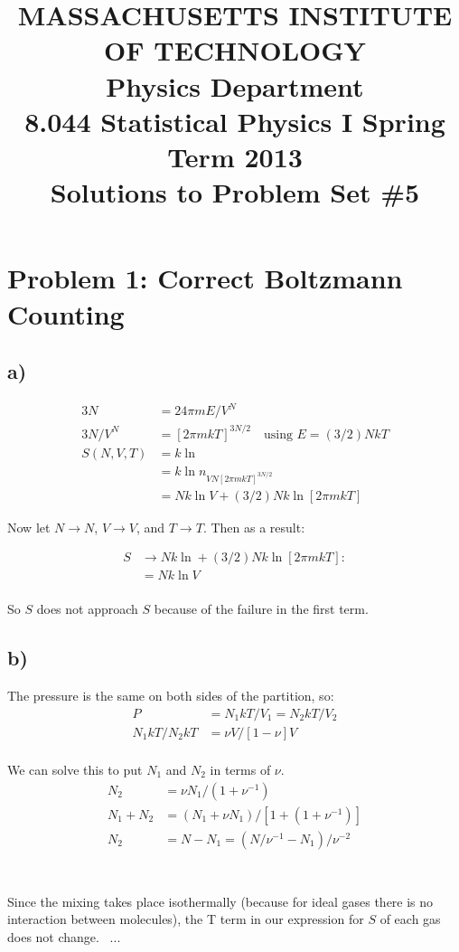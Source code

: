 \documentclass{article}
\begin{document}
\title{MASSACHUSETTS INSTITUTE OF TECHNOLOGY \\ Physics Department \\ 8.044 Statistical Physics I Spring Term 2013 \\ Solutions to Problem Set \#5}
\maketitle

\section*{Problem 1: Correct Boltzmann Counting}

\subsection*{a)}
\begin{align*}
3N &= 24\pi mE / V^N \\
3N / V^N &= [2\pi mkT]^{3N/2} \quad \text{using } E=(3/2)NkT \\
S(N,V,T) &= k \ln  \\
&=k \ln n_{VN[2\pi mkT]^{3N/2}} \\
&= Nk \ln V + (3/2)Nk \ln[2\pi mkT]
\end{align*}

Now let $N \rightarrow N$, $V \rightarrow V$, and $T \rightarrow T$. Then as a result:

\begin{align*}
S &\rightarrow  Nk \ln  + (3/2)Nk \ln[2\pi mkT] : \\
&= Nk \ln V \\
\end{align*}

So $S$ does not approach $S$ because of the failure in the first term.

\subsection*{b)} 
The pressure is the same on both sides of the partition, so:
\begin{align*}
P &= N_1kT/V_1= N_2kT/V_2 \\
N_1kT/N_2kT&=\nu V/[1-\nu]V \\
\end{align*}

We can solve this to put $N_1$ and $N_2$ in terms of $\nu$.
\begin{align*}
N_2&=\nu N_1/(1+\nu^{-1}) \\
N_1+N_2&=(N_1 + \nu N_1) / [1 + (1+\nu^{-1})] \\
N_2&=N-N_1=(N/\nu^{-1}-N_1)/ \nu^{-2} \\
\end{align*}
\\
\\
Since the mixing takes place isothermally (because for ideal gases there is no interaction between molecules), the T term in our expression for $S$ of each gas does not change. \
...
\end{document}
